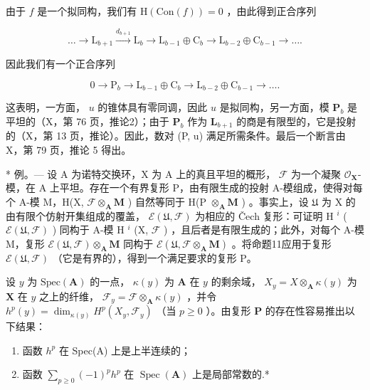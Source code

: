 由于 \(f\) 是一个拟同构，我们有 \(\mathrm{H}(\mathrm{Con}(f)) = 0\) ，由此得到正合序列

\[
\dots \rightarrow \mathrm{L} _ {b + 1} \xrightarrow {d _ {b + 1}} \mathrm{L} _ {b} \longrightarrow \mathrm{L} _ {b - 1} \oplus \mathrm{C} _ {b} \longrightarrow \mathrm{L} _ {b - 2} \oplus \mathrm{C} _ {b - 1} \rightarrow \dots .
\]

因此我们有一个正合序列

\[
0 \rightarrow \mathrm{P} _ {b} \rightarrow \mathrm{L} _ {b - 1} \oplus \mathrm{C} _ {b} \rightarrow \mathrm{L} _ {b - 2} \oplus \mathrm{C} _ {b - 1} \rightarrow \dots .
\]

这表明，一方面， \(u\) 的锥体具有零同调，因此 \(u\) 是拟同构，另一方面，模 \(\mathbf{P}_{b}\) 是平坦的（X，第 76 页，推论2）；由于 \(\mathbf{P}_{b}\) 作为 \(\mathbf{L}_{b+1}\) 的商是有限型的，它是投射的（X，第 13 页，推论）。因此，数对 (P, u) 满足所需条件。最后一个断言由 X，第 79 页，推论 5 得出。

* 例。--- 设 A 为诺特交换环，X 为 A 上的真且平坦的概形， \(\mathcal{F}\) 为一个凝聚 \(\mathcal{O}_{\mathbf{X}}\)-模，在 A 上平坦。存在一个有界复形 P，由有限生成的投射 A-模组成，使得对每个 A-模 M，H(X, \(\mathcal{F} \otimes_{\mathbf{A}} \mathbf{M}\) ) 自然等同于 H(P \(\otimes_{\mathbf{A}} \mathbf{M}\) ) 。事实上，设 \(\mathfrak{U}\) 为 X 的由有限个仿射开集组成的覆盖， \(\mathcal{E}(\mathfrak{U}, \mathcal{F})\) 为相应的 Čech 复形：可证明 H \(^{i}\) ( \(\mathcal{E}(\mathfrak{U}, \mathcal{F})\) ) 同构于 A-模 H \(^{i}\) (X, \(\mathcal{F}\) ) ，且后者是有限生成的；此外，对每个 A-模 M，复形 \(\mathcal{E}(\mathfrak{U}, \mathcal{F}) \otimes_{\mathbf{A}} \mathbf{M}\) 同构于 \(\mathcal{E}(\mathfrak{U}, \mathcal{F} \otimes_{\mathbf{A}} \mathbf{M})\) 。将命题11应用于复形 \(\mathcal{E}(\mathfrak{U}, \mathcal{F})\) （它是有界的），得到一个满足要求的复形 P。

设 \(y\) 为 \(\text{Spec}(\mathbf{A})\) 的一点， \(\kappa(y)\) 为 \(\mathbf{A}\) 在 \(y\) 的剩余域， \(X_y = X \otimes_{\mathbf{A}} \kappa(y)\) 为 \(\mathbf{X}\) 在 \(y\) 之上的纤维， \(\mathcal{F}_y = \mathcal{F} \otimes_{\mathbf{A}} \kappa(y)\) ，并令 \(h^p(y) = \dim_{\kappa(y)} H^p(X_y, \mathcal{F}_y)\) （当 \(p \geqslant 0\) ）。由复形 \(\mathbf{P}\) 的存在性容易推出以下结果：

\begin{enumerate}
\def\labelenumi{(\roman{enumi})}
\item
  函数 \(h^{p}\) 在 Spec(A) 上是上半连续的；
\item
  函数 \(\sum_{p\geqslant 0}(-1)^{p}h^{p}\) 在 \(\operatorname {Spec}(\mathbf{A})\) 上是局部常数的.*
\end{enumerate}

